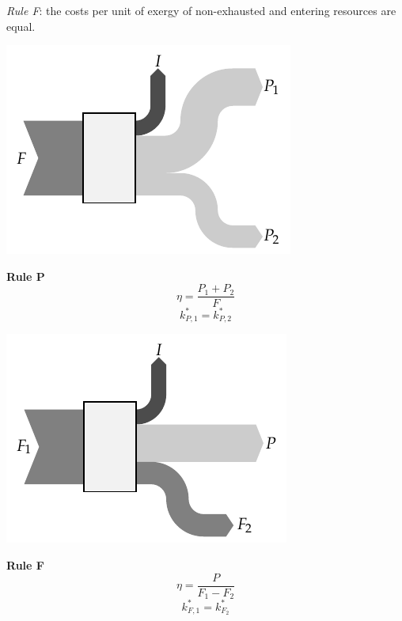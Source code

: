 \documentclass[energies,article,submit,moreauthors,pdftex]{Definitions/mdpi}
\begin{document}
\emph{Rule F}: the costs per unit of exergy of non-exhausted and entering resources are equal.
\begin{center}
  \begin{minipage}[c]{0.50\linewidth}
    \includegraphics{reglaP.pdf}
  \end{minipage}
  \begin{minipage}[c]{0.45\linewidth}
    \centering
    \textbf{Rule P}
    \begin{equation*}
        \eta=\frac{P_1+P_2}{F}
    \end{equation*}
    \begin{equation*}
        k_{P,1}^*=k_{P,2}^*    
    \end{equation*}
  \end{minipage}
\end{center}
\begin{center}
  \begin{minipage}[c]{0.50\linewidth}
    \includegraphics{reglaF.pdf}
  \end{minipage}
  \begin{minipage}[c]{0.45\linewidth}
    \centering
    \textbf{Rule F}
    \begin{equation*}
        \eta=\frac{P}{F_1-F_2}
    \end{equation*}
    \begin{equation*}
        k_{F,1}^*=k_{F_2}^*    
    \end{equation*}
  \end{minipage}
  \label{fig:RulesFP}
\end{center}
\end{document}
